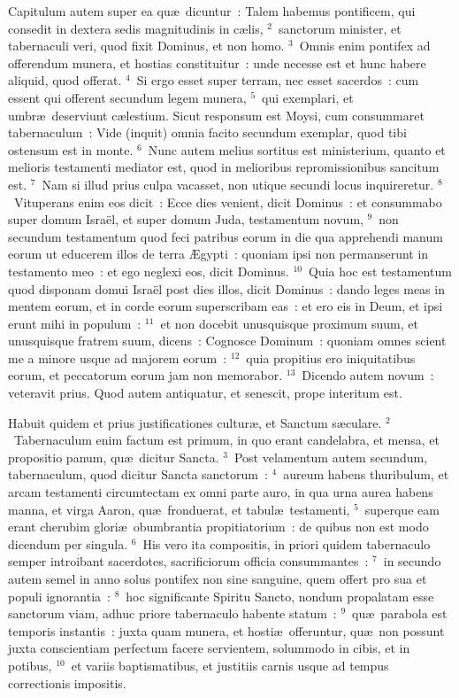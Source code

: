 \lettrine[lines=3,image=true,loversize=0.05,lraise=-0.03]{C}{}apitulum autem super ea qu\ae\ dicuntur~: Talem habemus pontificem, qui consedit in dextera sedis magnitudinis in c\ae lis,
${}^{2}$~sanctorum minister, et tabernaculi veri, quod fixit Dominus, et non homo.
${}^{3}$~Omnis enim pontifex ad offerendum munera, et hostias constituitur~: unde necesse est et hunc habere aliquid, quod offerat.
${}^{4}$~Si ergo esset super terram, nec esset sacerdos~: cum essent qui offerent secundum legem munera,
${}^{5}$~qui exemplari, et umbr\ae\ deserviunt c\ae lestium. Sicut responsum est Moysi, cum consummaret tabernaculum~: Vide (inquit) omnia facito secundum exemplar, quod tibi ostensum est in monte.
${}^{6}$~Nunc autem melius sortitus est ministerium, quanto et melioris testamenti mediator est, quod in melioribus repromissionibus sancitum est.
${}^{7}$~Nam si illud prius culpa vacasset, non utique secundi locus inquireretur.
${}^{8}$~Vituperans enim eos dicit~: Ecce dies venient, dicit Dominus~: et consummabo super domum Isra\"el, et super domum Juda, testamentum novum,
${}^{9}$~non secundum testamentum quod feci patribus eorum in die qua apprehendi manum eorum ut educerem illos de terra \AE gypti~: quoniam ipsi non permanserunt in testamento meo~: et ego neglexi eos, dicit Dominus.
${}^{10}$~Quia hoc est testamentum quod disponam domui Isra\"el post dies illos, dicit Dominus~: dando leges meas in mentem eorum, et in corde eorum superscribam eas~: et ero eis in Deum, et ipsi erunt mihi in populum~:
${}^{11}$~et non docebit unusquisque proximum suum, et unusquisque fratrem suum, dicens~: Cognosce Dominum~: quoniam omnes scient me a minore usque ad majorem eorum~:
${}^{12}$~quia propitius ero iniquitatibus eorum, et peccatorum eorum jam non memorabor.
${}^{13}$~Dicendo autem novum~: veteravit prius. Quod autem antiquatur, et senescit, prope interitum est.

\lettrine[lines=3,image=true,loversize=0.05,lraise=-0.03]{H}{}abuit quidem et prius justificationes cultur\ae , et Sanctum s\ae culare.
${}^{2}$~Tabernaculum enim factum est primum, in quo erant candelabra, et mensa, et propositio panum, qu\ae\ dicitur Sancta.
${}^{3}$~Post velamentum autem secundum, tabernaculum, quod dicitur Sancta sanctorum~:
${}^{4}$~aureum habens thuribulum, et arcam testamenti circumtectam ex omni parte auro, in qua urna aurea habens manna, et virga Aaron, qu\ae\ fronduerat, et tabul\ae\ testamenti,
${}^{5}$~superque eam erant cherubim glori\ae\ obumbrantia propitiatorium~: de quibus non est modo dicendum per singula.
${}^{6}$~His vero ita compositis, in priori quidem tabernaculo semper introibant sacerdotes, sacrificiorum officia consummantes~:
${}^{7}$~in secundo autem semel in anno solus pontifex non sine sanguine, quem offert pro sua et populi ignorantia~:
${}^{8}$~hoc significante Spiritu Sancto, nondum propalatam esse sanctorum viam, adhuc priore tabernaculo habente statum~:
${}^{9}$~qu\ae\ parabola est temporis instantis~: juxta quam munera, et hosti\ae\ offeruntur, qu\ae\ non possunt juxta conscientiam perfectum facere servientem, solummodo in cibis, et in potibus,
${}^{10}$~et variis baptismatibus, et justitiis carnis usque ad tempus correctionis impositis.


